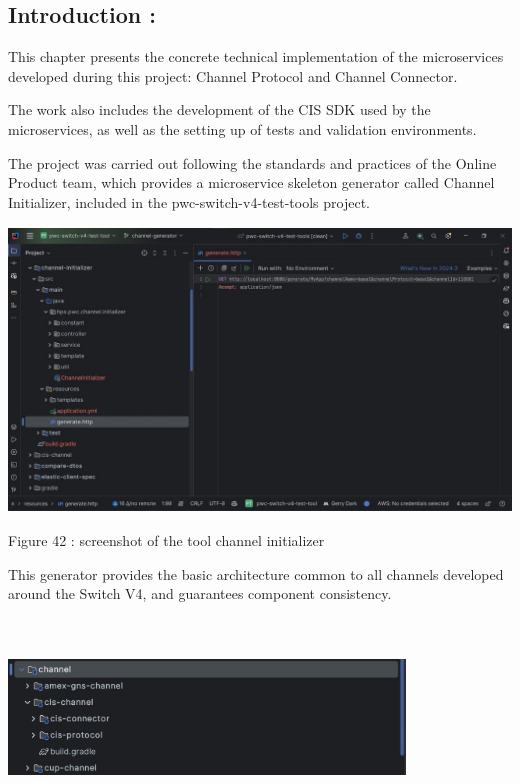 \documentclass[12pt,a4paper]{report}
\begin{document}
\hypertarget{introduction-2}{%
\subsection{\texorpdfstring{\textbf{Introduction
:}}{Introduction :}}\label{introduction-2}}

This chapter presents the concrete technical implementation of the
microservices developed during this project: Channel Protocol and
Channel Connector.

The work also includes the development of the CIS SDK used by the
microservices, as well as the setting up of tests and validation
environments.

The project was carried out following the standards and practices of the
Online Product team, which provides a microservice skeleton generator
called Channel Initializer, included in the pwc-switch-v4-test-tools
project.

\includegraphics[width=5.29167in,height=2.97881in]{vertopal_d1b0b2209edd4c6aa8254f57daa0953b/media/image61.jpeg}

\protect\hypertarget{_Toc201954518}{}{}Figure 42 : screenshot of the
tool channel initializer

This generator provides the basic architecture common to all channels
developed around the Switch V4, and guarantees component consistency.

\includegraphics[width=4.14583in,height=2.0625in]{vertopal_d1b0b2209edd4c6aa8254f57daa0953b/media/image62.jpg}
\end{document}
